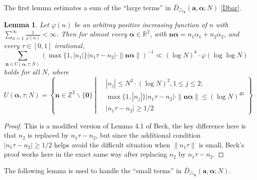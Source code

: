 \documentclass[11pt]{article}
\newtheorem{lem}[thm]{Lemma}
\newcommand{\beq}{\begin{equation}}
\newcommand{\eeq}{\end{equation}}
\newcommand{\fc}{\frac}
\renewcommand{\l}{\left}
\renewcommand{\r}{\right}
\newcommand{\Z}{\mathbb{Z}}
\newcommand{\R}{\mathbb{R}}
\renewcommand{\a}{\alpha}
\renewcommand{\(}{\left(}
\renewcommand{\)}{\right)}
\renewcommand{\bf}{\mathbf}
\newcommand{\bal}{\begin{aligned}}
\newcommand{\eal}{\end{aligned}}
\newcommand{\Dbar}{\bar{D}_{\triangle_{\bf{x}}} (\bm{a},\bm{\a}; N)}
\newcommand{\bma}{\bm{\alpha}}
\newcommand{\<}{\langle}
\renewcommand{\>}{\rangle}
\begin{document}
The first lemma estimates a sum of the ``large terms'' in $\Dbar$ \eqref{Dbar}.
\begin{lem}\label{lemma for sum of small divisors}
Let $\varphi(n)$ be an arbitray positive increasing function of $n$ with $\sum_{n=1}^{\infty} \fc{1}{\varphi(n)}< \infty$. Then for almost every $\bm{\a}\in \R^2$, with $\bf{n}\bm{\a}=n_1\a_1+n_2\a_2$, and every $\tau\in [0,1]$ irrational, 
\beq\label{Lemma for large terms}
\sum_{\bf{n}\in U(\bma, \tau;N)} \l(\max\{1,|n_1|\}|n_1\tau-n_2|\cdot \|\bf{n}\bm{\a}\|\r)^{-1} \ll (\log N)^k\cdot \varphi(\log \log N)
\eeq
holds for all $N$, where
\beq\label{Definition for set of large terms}
U(\bma,\tau;N)=\l\{
\bf{n}\in \Z^2\backslash \{\bf{0}\} \ \l| \
\bal & |n_j|\le N^2\cdot (\log N)^2, 1\le j\le 2; \\
&\max\{1,|n_j|\}|n_1\tau-n_2|\cdot \|\bf{n}\bm{\a}\|\le (\log N)^{40}\\
&|n_1\tau-n_2|\ge 1/2
\eal \r.
\r\}
\eeq
\end{lem}
\begin{proof}
This is a modified version of Lemma 4.1 of Beck\cite{Beck}, the key difference here is that $n_2$ is replaced by $n_1\tau-n_2$, but since the additional condition $|n_1\tau-n_2|\ge 1/2$ helps avoid the difficult situation when $\|n_1\tau\|$ is small, Beck's proof works here in the exact same way after replacing $n_2$ by $n_1\tau-n_2$. 
\end{proof}
The following lemma is used to handle the ``small terms'' in $\Dbar$.
\end{document}
